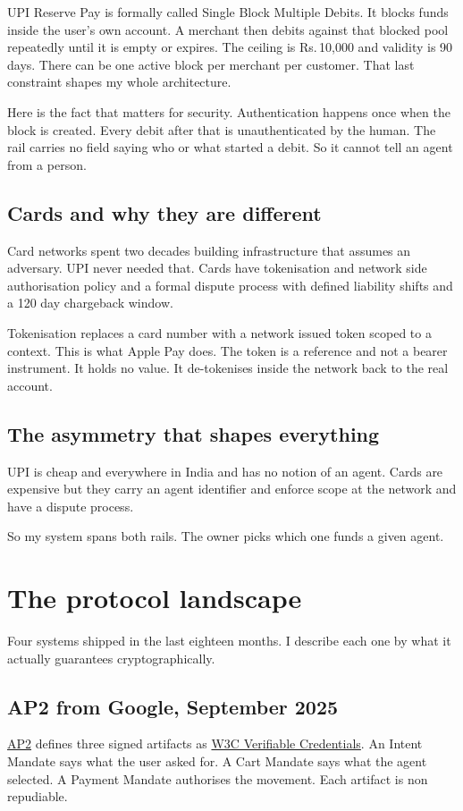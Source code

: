 \documentclass[journal,onecolumn,11pt]{IEEEtran}
\newcommand{\rs}{Rs.\,}
\begin{document}
UPI Reserve Pay is formally called Single Block Multiple Debits. It blocks funds inside
the user's own account. A merchant then debits against that blocked pool repeatedly
until it is empty or expires. The ceiling is \rs 10{,}000 and validity is 90 days. There
can be one active block per merchant per customer. That last constraint shapes my whole
architecture.

Here is the fact that matters for security. Authentication happens once when the block
is created. Every debit after that is unauthenticated by the human. The rail carries no
field saying who or what started a debit. So it cannot tell an agent from a person.

\subsection{Cards and why they are different}
Card networks spent two decades building infrastructure that assumes an adversary. UPI
never needed that. Cards have tokenisation and network side authorisation policy and a
formal dispute process with defined liability shifts and a 120 day chargeback window.

Tokenisation replaces a card number with a network issued token scoped to a context.
This is what Apple Pay does. The token is a reference and not a bearer instrument. It
holds no value. It de-tokenises inside the network back to the real account.

\subsection{The asymmetry that shapes everything}
UPI is cheap and everywhere in India and has no notion of an agent. Cards are expensive
but they carry an agent identifier and enforce scope at the network and have a dispute
process.

So my system spans both rails. The owner picks which one funds a given agent.

\section{The protocol landscape}\label{sec:proto}

Four systems shipped in the last eighteen months. I describe each one by what it
actually guarantees cryptographically.

\subsection{AP2 from Google, September 2025}
\href{https://ap2-protocol.org}{AP2} defines three signed artifacts as
\href{https://www.w3.org/TR/vc-data-model-2.0/}{W3C Verifiable Credentials}. An Intent
Mandate says what the user asked for. A Cart Mandate says what the agent selected. A
Payment Mandate authorises the movement. Each artifact is non repudiable.
\end{document}

